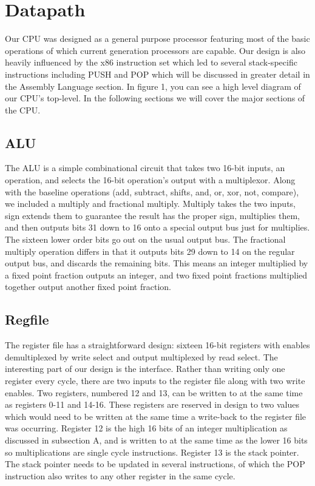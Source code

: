 \documentclass[onecolumn]{IEEEtran}
\begin{document}
\section{Datapath}
Our CPU was designed as a general purpose processor featuring most of the basic operations of which current generation processors are capable.  Our design is also heavily influenced by the x86 instruction set which led to several stack-specific instructions including PUSH and POP which will be discussed in greater detail in the Assembly Language section.  In figure 1, you can see a high level diagram of our CPU’s top-level.  In the following sections we will cover the major sections of the CPU.

\subsection{ALU}
The ALU is a simple combinational circuit that takes two 16-bit inputs, an operation, and selects the 16-bit operation’s output with a multiplexor.  Along with the baseline operations (add, subtract, shifts, and, or, xor, not, compare), we included a multiply and fractional multiply.  Multiply takes the two inputs, sign extends them to guarantee the result has the proper sign, multiplies them, and then outputs bits 31 down to 16 onto a special output bus just for multiplies.  The sixteen lower order bits go out on the usual output bus.  The fractional multiply operation differs in that it outputs bits 29 down to 14 on the regular output bus, and discards the remaining bits.  This means an integer multiplied by a fixed point fraction outputs an integer, and two fixed point fractions multiplied together output another fixed point fraction.

\subsection{Regfile}
The register file has a straightforward design: sixteen 16-bit registers with enables demultiplexed by write select and output multiplexed by read select.  The interesting part of our design is the interface.  Rather than writing only one register every cycle, there are two inputs to the register file along with two write enables.  Two registers, numbered 12 and 13, can be written to at the same time as registers 0-11 and 14-16.  These registers are reserved in design to two values which would need to be written at the same time a write-back to the register file was occurring.  Register 12 is the high 16 bits of an integer multiplication as discussed in subsection A, and is written to at the same time as the lower 16 bits so multiplications are single cycle instructions.  Register 13 is the stack pointer.  The stack pointer needs to be updated in several instructions, of which the POP instruction also writes to any other register in the same cycle.
\end{document}
